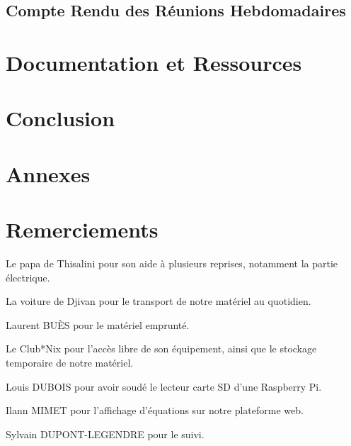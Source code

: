 \documentclass[a4paper,12pt]{report}  %
\begin{document}
\subsection{Compte Rendu des Réunions Hebdomadaires}



\section{Documentation et Ressources}

\section{Conclusion}

\section{Annexes}

\section{Remerciements}

Le papa de Thisalini pour son aide à plusieurs reprises, notamment la partie électrique.

La voiture de Djivan pour le transport de notre matériel au quotidien. 

Laurent BUÈS pour le matériel emprunté. 

Le Club*Nix pour l’accès libre de son équipement, ainsi que le stockage temporaire de notre matériel. 

Louis DUBOIS pour avoir soudé le lecteur carte SD d’une Raspberry Pi. 

Ilann MIMET pour l’affichage d’équations sur notre plateforme web. 

Sylvain DUPONT-LEGENDRE pour le suivi. 
\end{document}
